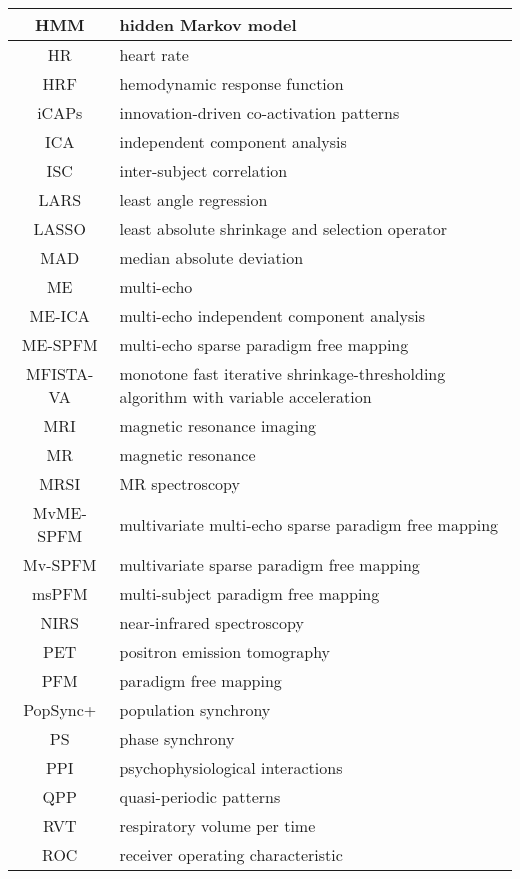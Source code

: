\begin{table}[h]
\begin{tabular}{|c|p{}|}
    \hline
    HMM & hidden Markov model \\
    \hline
    HR & heart rate \\
    \hline
    HRF & hemodynamic response function \\
    \hline
    iCAPs & innovation-driven co-activation patterns \\
    \hline
    ICA & independent component analysis \\
    \hline
    ISC & inter-subject correlation \\
    \hline
    LARS & least angle regression \\
    \hline
    LASSO & least absolute shrinkage and selection operator \\
    \hline
    MAD & median absolute deviation \\
    \hline
    ME & multi-echo \\
    \hline
    ME-ICA & multi-echo independent component analysis \\
    \hline
    ME-SPFM & multi-echo sparse paradigm free mapping \\
    \hline
    MFISTA-VA & monotone fast iterative shrinkage-thresholding algorithm with variable acceleration \\
    \hline
    MRI & magnetic resonance imaging \\
    \hline
    MR & magnetic resonance \\
    \hline
    MRSI & MR spectroscopy \\
    \hline
    MvME-SPFM & multivariate multi-echo sparse paradigm free mapping \\
    \hline
    Mv-SPFM & multivariate sparse paradigm free mapping \\
    \hline
    msPFM & multi-subject paradigm free mapping \\
    \hline
    NIRS & near-infrared spectroscopy \\
    \hline
    PET & positron emission tomography \\
    \hline
    PFM & paradigm free mapping \\
    \hline
    PopSync+ & population synchrony \\
    \hline
    PS & phase synchrony \\
    \hline
    PPI & psychophysiological interactions \\
    \hline
    QPP & quasi-periodic patterns \\
    \hline
    RVT & respiratory volume per time \\
    \hline
    ROC & receiver operating characteristic \\

\end{tabular}
\end{table}
